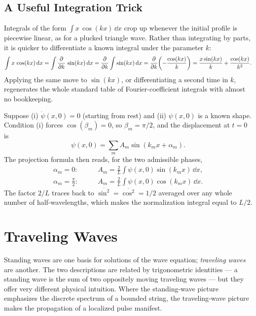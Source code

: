 \subsection{A Useful Integration Trick}

Integrals of the form $\int x\,\cos(kx)\,\dd x$ crop up whenever the initial profile is piecewise linear, as for a plucked triangle wave. Rather than integrating by parts, it is quicker to differentiate a known integral under the parameter $k$:
\begin{equation}
    \int x\,\cos(kx)\,\dd x = \int \pdv{k}\,\sin(kx)\,\dd x = \pdv{k}\int\sin(kx)\,\dd x = \pdv{k}\!\left(-\frac{\cos(kx)}{k}\right) = \frac{x\sin(kx)}{k} + \frac{\cos(kx)}{k^2}.
\end{equation}
Applying the same move to $\sin(kx)$, or differentiating a second time in $k$, regenerates the whole standard table of Fourier-coefficient integrals with almost no bookkeeping.

\begin{example}
Suppose (i) $\dot\psi(x,0) = 0$ (starting from rest) and (ii) $\psi(x,0)$ is a known shape. Condition (i) forces $\cos(\beta_m) = 0$, so $\beta_m = \pi/2$, and the displacement at $t=0$ is
\begin{equation}
    \psi(x, 0) = \sum_m A_m \sin(k_m x + \alpha_m).
\end{equation}
The projection formula then reads, for the two admissible phases,
\begin{align}
    \alpha_m = 0: &\qquad A_m = \frac{2}{L}\int \psi(x,0)\sin(k_m x)\,\dd x, \\
    \alpha_m = \tfrac{\pi}{2}: &\qquad A_m = \frac{2}{L}\int \psi(x,0)\cos(k_m x)\,\dd x.
\end{align}
The factor $2/L$ traces back to $\overline{\sin^2} = \overline{\cos^2} = 1/2$ averaged over any whole number of half-wavelengths, which makes the normalization integral equal to $L/2$.
\end{example}

\section{Traveling Waves}

Standing waves are one basis for solutions of the wave equation; \emph{traveling waves} are another. The two descriptions are related by trigonometric identities --- a standing wave is the sum of two oppositely moving traveling waves --- but they offer very different physical intuition. Where the standing-wave picture emphasizes the discrete spectrum of a bounded string, the traveling-wave picture makes the propagation of a localized pulse manifest.

